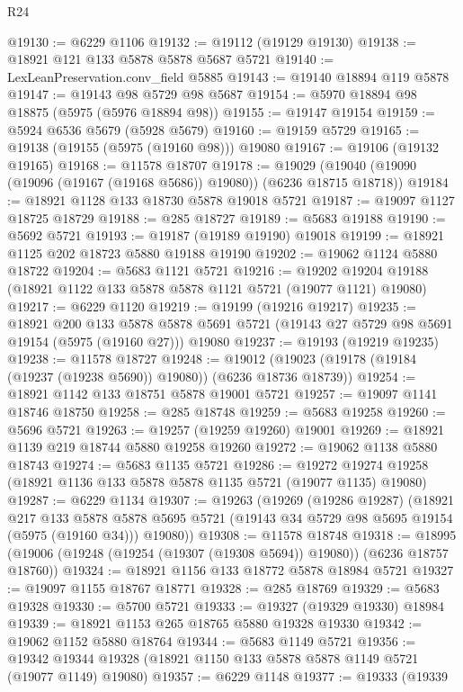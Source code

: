 \begin{lexlean}{R24}
\begin{coremodule}
@19130 := @6229 @1106
@19132 := @19112 (@19129 @19130)
@19138 := @18921 @121 @133 @5878 @5878 @5687 @5721
@19140 := LexLeanPreservation.conv_field @5885
@19143 := @19140 @18894 @119 @5878
@19147 := @19143 @98 @5729 @98 @5687
@19154 := @5970 @18894 @98 @18875 (@5975 (@5976 @18894 @98))
@19155 := @19147 @19154
@19159 := @5924 @6536 @5679 (@5928 @5679)
@19160 := @19159 @5729
@19165 := @19138 (@19155 (@5975 (@19160 @98))) @19080
@19167 := @19106 (@19132 @19165)
@19168 := @11578 @18707
@19178 := @19029 (@19040 (@19090 (@19096 (@19167 (@19168 @5686)) @19080)) (@6236 @18715 @18718))
@19184 := @18921 @1128 @133 @18730 @5878 @19018 @5721
@19187 := @19097 @1127 @18725 @18729
@19188 := @285 @18727
@19189 := @5683 @19188
@19190 := @5692 @5721
@19193 := @19187 (@19189 @19190) @19018
@19199 := @18921 @1125 @202 @18723 @5880 @19188 @19190
@19202 := @19062 @1124 @5880 @18722
@19204 := @5683 @1121 @5721
@19216 := @19202 @19204 @19188 (@18921 @1122 @133 @5878 @5878 @1121 @5721 (@19077 @1121) @19080)
@19217 := @6229 @1120
@19219 := @19199 (@19216 @19217)
@19235 := @18921
    @200
    @133
    @5878
    @5878
    @5691
    @5721
    (@19143 @27 @5729 @98 @5691 @19154 (@5975 (@19160 @27)))
    @19080
@19237 := @19193 (@19219 @19235)
@19238 := @11578 @18727
@19248 := @19012 (@19023 (@19178 (@19184 (@19237 (@19238 @5690)) @19080)) (@6236 @18736 @18739))
@19254 := @18921 @1142 @133 @18751 @5878 @19001 @5721
@19257 := @19097 @1141 @18746 @18750
@19258 := @285 @18748
@19259 := @5683 @19258
@19260 := @5696 @5721
@19263 := @19257 (@19259 @19260) @19001
@19269 := @18921 @1139 @219 @18744 @5880 @19258 @19260
@19272 := @19062 @1138 @5880 @18743
@19274 := @5683 @1135 @5721
@19286 := @19272 @19274 @19258 (@18921 @1136 @133 @5878 @5878 @1135 @5721 (@19077 @1135) @19080)
@19287 := @6229 @1134
@19307 := @19263
    (@19269
      (@19286 @19287)
      (@18921
        @217
        @133
        @5878
        @5878
        @5695
        @5721
        (@19143 @34 @5729 @98 @5695 @19154 (@5975 (@19160 @34)))
        @19080))
@19308 := @11578 @18748
@19318 := @18995 (@19006 (@19248 (@19254 (@19307 (@19308 @5694)) @19080)) (@6236 @18757 @18760))
@19324 := @18921 @1156 @133 @18772 @5878 @18984 @5721
@19327 := @19097 @1155 @18767 @18771
@19328 := @285 @18769
@19329 := @5683 @19328
@19330 := @5700 @5721
@19333 := @19327 (@19329 @19330) @18984
@19339 := @18921 @1153 @265 @18765 @5880 @19328 @19330
@19342 := @19062 @1152 @5880 @18764
@19344 := @5683 @1149 @5721
@19356 := @19342 @19344 @19328 (@18921 @1150 @133 @5878 @5878 @1149 @5721 (@19077 @1149) @19080)
@19357 := @6229 @1148
@19377 := @19333
    (@19339

\end{coremodule}
\end{lexlean}

